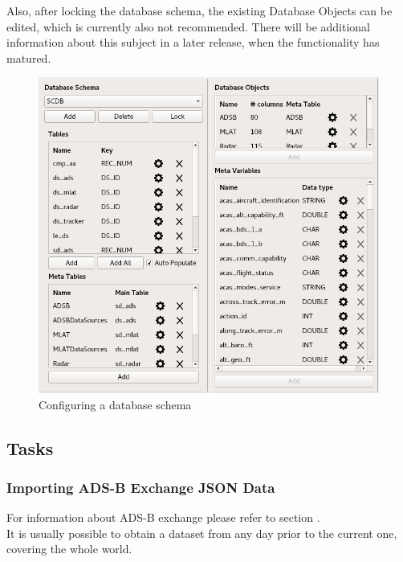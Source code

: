 Also, after locking the database schema, the existing Database Objects can be edited, which is currently also not recommended. There will be additional information about this subject in a later release, when the functionality has matured.

\begin{figure}[H]
  \hspace*{-1cm}
    \includegraphics[width=16cm,frame]{../screenshots/database_schema_configuration.png}
  \caption{Configuring a database schema}
  \label{fig:db_schema_configuration}
\end{figure}

\subsection{Tasks}
\label{sec:tasks}

\subsubsection{Importing ADS-B Exchange JSON Data}

For information about ADS-B exchange please refer to section . \\

It is usually possible to obtain a dataset from any day prior to the current one, covering the whole world. \\

